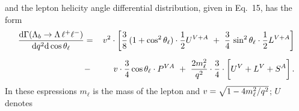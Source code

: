 and the lepton helicity angle differential distribution, given in Eq.~15, has the form
\begin{eqnarray}
\label{costheta2}
\frac{\mathrm{d}\Gamma(\Lambda_{b}\rightarrow \Lambda \,\ell^{+}\ell^{-})}{\mathrm{d}q^2\mathrm{d}\cos\theta_\ell} 
&=&\,
v^{2}\cdot\bigg[\frac{3}{8}\,(1+\cos^2\theta_\ell)\cdot
\frac{1}{2} U^{V+A}  
\ + \ \frac{3}{4}\,\sin^2\theta_\ell\cdot
\frac{1}{2} L^{V+A} \bigg]\label{distr2}\nonumber\\[2mm]
&-&\,v \cdot\frac{3}{4}\cos\theta_\ell\cdot P^{VA} 
\ + \ \frac{2m_{\ell}^{2}}{q^{2}}\cdot \frac{3}{4}\cdot
\bigg[ U^{V}+ L^{V} + S^{A} \bigg]\,.
\end{eqnarray}
%
In these espressions $m_\ell$ is the mass of the lepton and $v = \sqrt{1-4m_\ell^2/q^2}$; $U$ denotes
